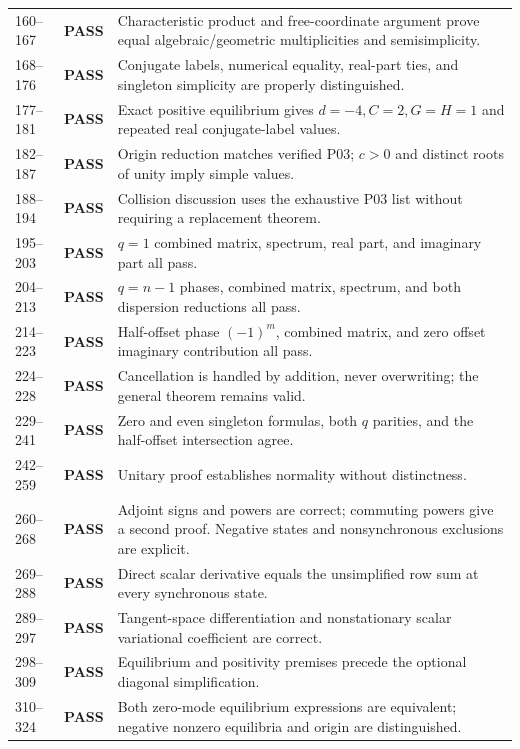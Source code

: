 \documentclass[11pt]{article}
\begin{document}
{\begin{longtable}{L{0.10\textwidth}L{0.17\textwidth}L{0.64\textwidth}}
160--167 & \textbf{PASS} & Characteristic product and free-coordinate argument prove equal algebraic/geometric multiplicities and semisimplicity.\\
168--176 & \textbf{PASS} & Conjugate labels, numerical equality, real-part ties, and singleton simplicity are properly distinguished.\\
177--181 & \textbf{PASS} & Exact positive equilibrium gives $d=-4,C=2,G=H=1$ and repeated real conjugate-label values.\\
182--187 & \textbf{PASS} & Origin reduction matches verified P03; $c>0$ and distinct roots of unity imply simple values.\\
188--194 & \textbf{PASS} & Collision discussion uses the exhaustive P03 list without requiring a replacement theorem.\\
195--203 & \textbf{PASS} & $q=1$ combined matrix, spectrum, real part, and imaginary part all pass.\\
204--213 & \textbf{PASS} & $q=n-1$ phases, combined matrix, spectrum, and both dispersion reductions all pass.\\
214--223 & \textbf{PASS} & Half-offset phase $(-1)^m$, combined matrix, and zero offset imaginary contribution all pass.\\
224--228 & \textbf{PASS} & Cancellation is handled by addition, never overwriting; the general theorem remains valid.\\
229--241 & \textbf{PASS} & Zero and even singleton formulas, both $q$ parities, and the half-offset intersection agree.\\
242--259 & \textbf{PASS} & Unitary proof establishes normality without distinctness.\\
260--268 & \textbf{PASS} & Adjoint signs and powers are correct; commuting powers give a second proof. Negative states and nonsynchronous exclusions are explicit.\\
269--288 & \textbf{PASS} & Direct scalar derivative equals the unsimplified row sum at every synchronous state.\\
289--297 & \textbf{PASS} & Tangent-space differentiation and nonstationary scalar variational coefficient are correct.\\
298--309 & \textbf{PASS} & Equilibrium and positivity premises precede the optional diagonal simplification.\\
310--324 & \textbf{PASS} & Both zero-mode equilibrium expressions are equivalent; negative nonzero equilibria and origin are distinguished.\\

\end{longtable}}
\end{document}
